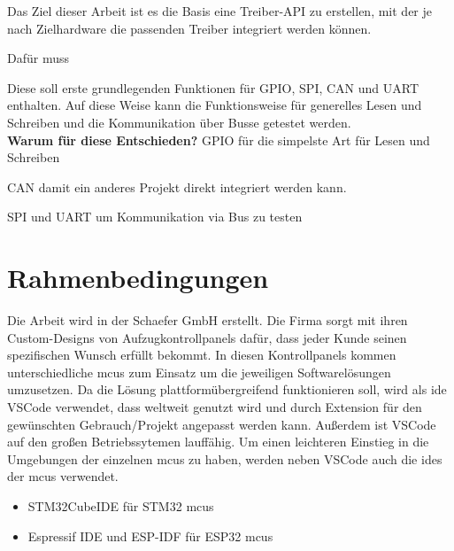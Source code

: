Das Ziel dieser Arbeit ist es die Basis eine Treiber-API zu erstellen, mit der je nach Zielhardware die passenden Treiber integriert werden können.

Dafür muss 

Diese soll erste grundlegenden Funktionen für GPIO, SPI, CAN und UART enthalten. 
Auf diese Weise kann die Funktionsweise für generelles Lesen und Schreiben und die Kommunikation über Busse getestet werden.
\\

\textbf{Warum für diese Entschieden?}
GPIO für die simpelste Art für Lesen und Schreiben

CAN damit ein anderes Projekt direkt integriert werden kann.


SPI und UART um Kommunikation via Bus zu testen




\section{Rahmenbedingungen}
Die Arbeit wird in der Schaefer GmbH erstellt. 
Die Firma sorgt mit ihren Custom-Designs von Aufzugkontrollpanels dafür, dass jeder Kunde seinen spezifischen Wunsch erfüllt bekommt.
In diesen Kontrollpanels kommen unterschiedliche \gls{mcu}s zum Einsatz um die jeweiligen Softwarelösungen umzusetzen.
Da die Lösung plattformübergreifend funktionieren soll, wird als \gls{ide} VSCode verwendet, dass weltweit genutzt wird und durch Extension für den gewünschten Gebrauch/Projekt angepasst werden kann. 
Außerdem ist VSCode auf den großen Betriebssytemen lauffähig.
Um einen leichteren Einstieg in die Umgebungen der einzelnen \gls{mcu}s zu haben, werden neben VSCode auch die \gls{ide}s der \gls{mcu}s verwendet.
\begin{itemize}
	\item STM32CubeIDE für STM32 \gls{mcu}s
	\item Espressif IDE und ESP-IDF für ESP32 \gls{mcu}s
\end{itemize}


